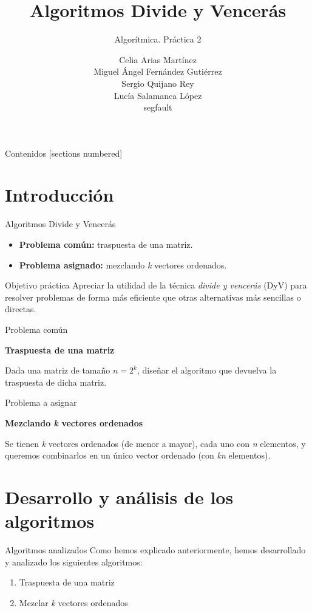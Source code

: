 \documentclass[10pt, xcolor=table]{beamer}
\title{Algoritmos Divide y Vencerás}
\subtitle{Algorítmica. \alert{Práctica 2}}
\date{}
\author{Celia Arias Martínez\\Miguel Ángel Fernández Gutiérrez\\Sergio Quijano Rey\\Lucía Salamanca López\\[4pt]\footnotesize{segfault}}
\begin{document}
\maketitle

\begin{frame}{Contenidos}
	[sections numbered]
	\tableofcontents[]
\end{frame}


\section{Introducción}
\begin{frame}{Algoritmos Divide y Vencerás}
\begin{itemize}
	\item \textbf{Problema común:} traspuesta de una matriz.
	\item \textbf{Problema asignado:} mezclando \textit{k} vectores ordenados.
\end{itemize}
\end{frame}

\begin{frame}{Objetivo práctica}
Apreciar la utilidad de la técnica \emph{divide y vencerás} (DyV)  para resolver problemas de forma más eficiente que otras alternativas más sencillas o directas.
\end{frame}

\begin{frame}{Problema común}
\begin{center}
\textbf{\large{Traspuesta de una matriz}}
\end{center}
Dada una matriz de tamaño $n=2^k$, diseñar el algoritmo que devuelva la traspuesta de dicha matriz.
\end{frame}

\begin{frame}{Problema a asignar}
\begin{center}
\textbf{\large{Mezclando \textit{k} vectores ordenados}}
\end{center}
Se tienen \textit{k} vectores ordenados (de menor a mayor), cada uno con \textit{n} elementos, y queremos combinarlos en un único vector ordenado (con \textit{kn} elementos). 
\end{frame}

\section{Desarrollo y análisis de los algoritmos}
\begin{frame}{Algoritmos analizados}
Como hemos explicado anteriormente, hemos desarrollado y analizado los siguientes algoritmos:
\begin{enumerate}
	\item Traspuesta de una matriz
	\item Mezclar \textit{k} vectores ordenados	
\end{enumerate}
\end{frame}
\end{document}
